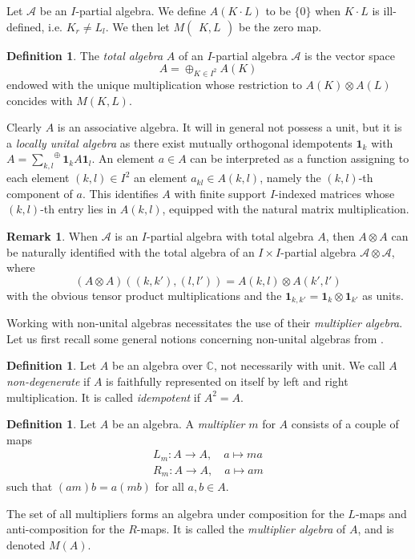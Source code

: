 \documentclass[10pt]{article}
\newcommand{\C}{\mathbb{C}}
\newcommand{\osum}[1]{\underset{#1}{\sum}^{\oplus}}
\newcommand{\Grs}[3]{#1{\begin{pmatrix} #2,  #3\end{pmatrix}}}
\newcommand{\Unit}{\mathbf{1}}
\newcommand{\wmult}{\cdot}
\theoremstyle{definition}
\newtheorem{Def}[Theorem]{Definition}
\newtheorem{Rem}[Theorem]{Remark}
\numberwithin{equation}{section}
\begin{document}
Let $\mathscr{A}$ be an $I$-partial algebra. We define $A(K\wmult L)$ to be $\{0\}$ when $K\wmult L$ is ill-defined, i.e. $K_r\neq L_l$. We then let $\Grs{M}{K}{L}$ be the zero map.

\begin{Def} The \emph{total algebra} $A$ of an $I$-partial algebra $\mathscr{A}$ is the vector space \[A = \oplus_{K\in I^2} A(K)\] endowed with the unique multiplication whose restriction to $A(K)\otimes A(L)$ concides with $M(K,L)$. 
\end{Def} 

Clearly $A$ is an associative algebra. It will in general not possess a unit, but it is a \emph{locally unital algebra} as there exist mutually orthogonal idempotents $\mathbf{1}_k$ with $A = \osum{k,l} \mathbf{1}_kA\mathbf{1}_l$. An element $a\in A$ can be interpreted as a function assigning to each element $(k,l)\in I^2$ an element $a_{kl}\in A(k,l)$, namely the $(k,l)$-th component of $a$. This identifies $A$ with finite support $I$-indexed matrices whose $(k,l)$-th entry lies in $A(k,l)$, equipped with the natural matrix multiplication. 

\begin{Rem}\label{RemGrad} When $\mathscr{A}$ is an $I$-partial algebra with total algebra $A$, then $A\otimes A$ can be naturally identified with the total algebra of an $I\times I$-partial algebra $\mathscr{A}\otimes \mathscr{A}$, where \[(A\otimes A)((k,k'),(l,l')) = A(k,l)\otimes A(k',l')\] with the obvious tensor product multiplications and the $\Unit_{k,k'} = \Unit_k\otimes \Unit_{k'}$ as units. 
\end{Rem}

Working with non-unital algebras necessitates the use of their \emph{multiplier algebra}. Let us first recall some general notions concerning non-unital algebras from \cite{Dau1,VDae1}.

\begin{Def} Let $A$ be an algebra over $\C$, not necessarily with unit. We call $A$ \emph{non-degenerate} if $A$ is faithfully represented on itself by left and right multiplication. It is called \emph{idempotent} if $A^2 = A$. 
\end{Def}

\begin{Def} Let $A$ be an algebra. A \emph{multiplier} $m$ for $A$ consists of a couple of maps \begin{eqnarray*} L_m:A\rightarrow A,\quad a\mapsto ma\\ R_m:A\rightarrow A,\quad a\mapsto am\end{eqnarray*} such that $(am)b = a(mb)$ for all $a,b\in A$. 

The set of all multipliers forms an algebra under composition for the $L$-maps and anti-composition for the $R$-maps. It is called the \emph{multiplier algebra} of $A$, and is denoted $M(A)$.
\end{Def}
\end{document}
